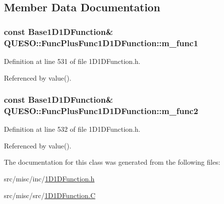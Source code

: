 \subsection{Member Data Documentation}
\hypertarget{class_q_u_e_s_o_1_1_func_plus_func1_d1_d_function_ab74636433f4ce2bb8ca93cf7c1c1d72e}{
\subsubsection[{m\-\_\-func1}]{\setlength{\rightskip}{0pt plus 5cm}const {\bf Base1\-D1\-D\-Function}\& Q\-U\-E\-S\-O\-::\-Func\-Plus\-Func1\-D1\-D\-Function\-::m\-\_\-func1\hspace{0.3cm}{\ttfamily [protected]}}}\label{class_q_u_e_s_o_1_1_func_plus_func1_d1_d_function_ab74636433f4ce2bb8ca93cf7c1c1d72e}


Definition at line 531 of file 1\-D1\-D\-Function.\-h.



Referenced by value().

\hypertarget{class_q_u_e_s_o_1_1_func_plus_func1_d1_d_function_a82867f82d1b09ae165d5b2e730a49bdd}{
\subsubsection[{m\-\_\-func2}]{\setlength{\rightskip}{0pt plus 5cm}const {\bf Base1\-D1\-D\-Function}\& Q\-U\-E\-S\-O\-::\-Func\-Plus\-Func1\-D1\-D\-Function\-::m\-\_\-func2\hspace{0.3cm}{\ttfamily [protected]}}}\label{class_q_u_e_s_o_1_1_func_plus_func1_d1_d_function_a82867f82d1b09ae165d5b2e730a49bdd}


Definition at line 532 of file 1\-D1\-D\-Function.\-h.



Referenced by value().



The documentation for this class was generated from the following files\-:\begin{DoxyCompactItemize}
\item 
src/misc/inc/\hyperlink{1_d1_d_function_8h}{1\-D1\-D\-Function.\-h}\item 
src/misc/src/\hyperlink{1_d1_d_function_8_c}{1\-D1\-D\-Function.\-C}\end{DoxyCompactItemize}
